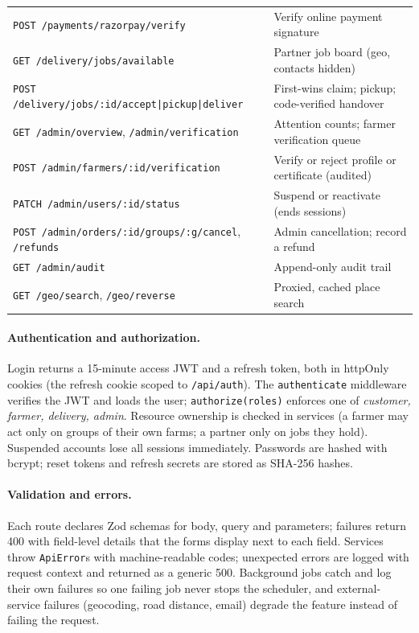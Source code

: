 \documentclass[manuscript,screen,review]{acmart}
\begin{document}
\begin{table}[htbp]
\begin{tabularx}{\columnwidth}{@{}p{}L@{}}
    \texttt{POST /payments/razorpay/verify} & Verify online payment signature \\
    \texttt{GET /delivery/jobs/available} & Partner job board (geo, contacts hidden) \\
    \texttt{POST /delivery/jobs/:id/accept|pickup|deliver} & First-wins claim; pickup; code-verified handover \\
    \texttt{GET /admin/overview}, \texttt{/admin/verification} & Attention counts; farmer verification queue \\
    \texttt{POST /admin/farmers/:id/verification} & Verify or reject profile or certificate (audited) \\
    \texttt{PATCH /admin/users/:id/status} & Suspend or reactivate (ends sessions) \\
    \texttt{POST /admin/orders/:id/groups/:g/cancel}, \texttt{/refunds} & Admin cancellation; record a refund \\
    \texttt{GET /admin/audit} & Append-only audit trail \\
    \texttt{GET /geo/search}, \texttt{/geo/reverse} & Proxied, cached place search \\
    \bottomrule
  \end{tabularx}
\end{table}

\paragraph{Authentication and authorization.} Login returns a 15-minute access JWT and a refresh token, both in httpOnly cookies (the refresh cookie scoped to \texttt{/api/auth}). The \texttt{authenticate} middleware verifies the JWT and loads the user; \texttt{authorize(roles)} enforces one of \emph{customer, farmer, delivery, admin}. Resource ownership is checked in services (a farmer may act only on groups of their own farms; a partner only on jobs they hold). Suspended accounts lose all sessions immediately. Passwords are hashed with bcrypt; reset tokens and refresh secrets are stored as SHA-256 hashes.

\paragraph{Validation and errors.} Each route declares Zod schemas for body, query and parameters; failures return 400 with field-level details that the forms display next to each field. Services throw \texttt{ApiError}s with machine-readable codes; unexpected errors are logged with request context and returned as a generic 500. Background jobs catch and log their own failures so one failing job never stops the scheduler, and external-service failures (geocoding, road distance, email) degrade the feature instead of failing the request.
\end{document}
